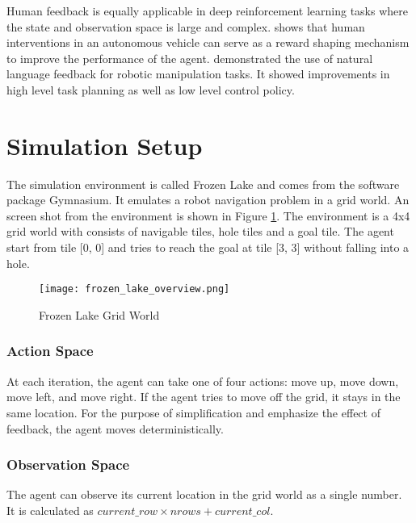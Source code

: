 \documentclass[conference]{IEEEtran}
\begin{document}
Human feedback is equally applicable in deep reinforcement learning tasks where the state and observation space is large and complex. \cite{j.wuHumanGuidedReinforcementLearning2023} shows that human interventions in an autonomous vehicle can serve as a reward shaping mechanism to improve the performance of the agent. \cite{zhaDistillingRetrievingGeneralizable2024} demonstrated the use of natural language feedback for robotic manipulation tasks. It showed improvements in high level task planning as well as low level control policy.

\section{Simulation Setup}

The simulation environment is called Frozen Lake and comes from the software package Gymnasium\cite{towersGymnasium2024}. It emulates a robot navigation problem in a grid world. An screen shot from the environment is shown in Figure \ref{fig:frozen_lake_overview}. The environment is a 4x4 grid world with consists of navigable tiles, hole tiles and a goal tile. The agent start from tile [0, 0] and tries to reach the goal at tile [3, 3] without falling into a hole.

\begin{figure}
    \centering
    \texttt{[image: frozen\_lake\_overview.png]}
    \caption{Frozen Lake Grid World}
    \label{fig:frozen_lake_overview}
\end{figure}

\subsubsection{Action Space}

At each iteration, the agent can take one of four actions: move up, move down, move left, and move right. If the agent tries to move off the grid, it stays in the same location. For the purpose of simplification and emphasize the effect of feedback, the agent moves deterministically.

\subsubsection{Observation Space}

The agent can observe its current location in the grid world as a single number. It is calculated as \(current\_row \times nrows + current\_col\).
\end{document}
